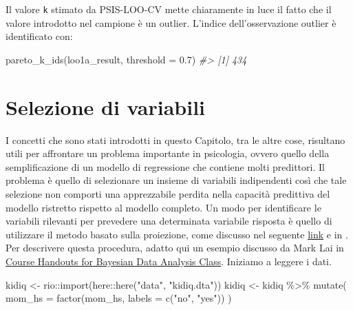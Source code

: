 \documentclass[
  10pt,
  italian,
  a4paper,
  extrafontsizes,onecolumn,openright
  ]{memoir}
\newenvironment{Shaded}{\begin{snugshade}}{\end{snugshade}}
\newcommand{\AttributeTok}[1]{\textcolor[rgb]{0.77,0.63,0.00}{#1}}
\newcommand{\CommentTok}[1]{\textcolor[rgb]{0.56,0.35,0.01}{\textit{#1}}}
\newcommand{\FloatTok}[1]{\textcolor[rgb]{0.00,0.00,0.81}{#1}}
\newcommand{\FunctionTok}[1]{\textcolor[rgb]{0.00,0.00,0.00}{#1}}
\newcommand{\NormalTok}[1]{#1}
\newcommand{\OtherTok}[1]{\textcolor[rgb]{0.56,0.35,0.01}{#1}}
\newcommand{\SpecialCharTok}[1]{\textcolor[rgb]{0.00,0.00,0.00}{#1}}
\newcommand{\StringTok}[1]{\textcolor[rgb]{0.31,0.60,0.02}{#1}}
\theoremstyle{definition}
\theoremstyle{definition}
\theoremstyle{definition}
\theoremstyle{definition}
\theoremstyle{remark}
\begin{document}
\noindent
Il valore \texttt{k} stimato da PSIS-LOO-CV mette chiaramente in luce il fatto che il valore introdotto nel campione è un outlier. L'indice dell'osservazione outlier è identificato con:

\begin{Shaded}
\begin{Highlighting}[]
\FunctionTok{pareto\_k\_ids}\NormalTok{(loo1a\_result, }\AttributeTok{threshold =} \FloatTok{0.7}\NormalTok{)}
\CommentTok{\#\textgreater{} [1] 434}
\end{Highlighting}
\end{Shaded}

\hypertarget{selezione-di-variabili}{%
\section{Selezione di variabili}\label{selezione-di-variabili}}

I concetti che sono stati introdotti in questo Capitolo, tra le altre cose, risultano utili per affrontare un problema importante in psicologia, ovvero quello della semplificazione di un modello di regressione che contiene molti predittori. Il problema è quello di selezionare un insieme di variabili indipendenti così che tale selezione non comporti una apprezzabile perdita nella capacità predittiva del modello ristretto rispetto al modello completo. Un modo per identificare le variabili rilevanti per prevedere una determinata variabile risposta è quello di utilizzare il metodo basato sulla proiezione, come discusso nel seguente \href{https://cran.r-project.org/web/packages/projpred/vignettes/quickstart.html}{link} e in \textcite{piironen2017comparison}. Per descrivere questa procedura, adatto qui un esempio discusso da Mark Lai in \href{https://bookdown.org/marklhc/notes_bookdown/model-comparison-and-regularization.html}{Course Handouts for Bayesian Data Analysis Class}. Iniziamo a leggere i dati.

\begin{Shaded}
\begin{Highlighting}[]
\NormalTok{kidiq }\OtherTok{\textless{}{-}}\NormalTok{ rio}\SpecialCharTok{::}\FunctionTok{import}\NormalTok{(here}\SpecialCharTok{::}\FunctionTok{here}\NormalTok{(}\StringTok{"data"}\NormalTok{, }\StringTok{"kidiq.dta"}\NormalTok{))}
\NormalTok{kidiq }\OtherTok{\textless{}{-}}\NormalTok{ kidiq }\SpecialCharTok{\%\textgreater{}\%}
  \FunctionTok{mutate}\NormalTok{(}
    \AttributeTok{mom\_hs =} \FunctionTok{factor}\NormalTok{(mom\_hs, }\AttributeTok{labels =} \FunctionTok{c}\NormalTok{(}\StringTok{"no"}\NormalTok{, }\StringTok{"yes"}\NormalTok{))}
\NormalTok{  )}
\end{Highlighting}
\end{Shaded}
\end{document}
